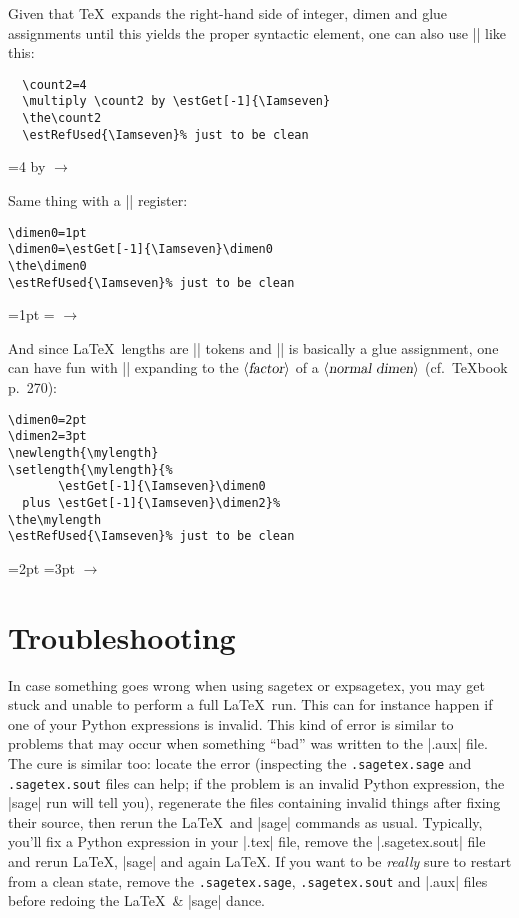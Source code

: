 \documentclass{article}
\newcommand*{\pkg}{\textsf}
\newcommand*{\meta}[1]{$\langle \textsl{#1} \rangle$}
\begin{document}
{%
  Given that \TeX\ expands the right-hand side of integer, dimen and glue
  assignments until this yields the proper syntactic element, one can also use
  |\estGet| like this:
  \begin{verbatim}
  \count2=4
  \multiply \count2 by \estGet[-1]{\Iamseven}
  \the\count2
  \estRefUsed{\Iamseven}% just to be clean
  \end{verbatim}
  =4
  \multiply {} by \estGet[-1]{\Iamseven}
  $\rightarrow$ \the{} %
  \estRefUsed{\Iamseven}
}

\bigskip
Same thing with a |\dimen| register:
\begin{verbatim}
\dimen0=1pt
\dimen0=\estGet[-1]{\Iamseven}\dimen0
\the\dimen0
\estRefUsed{\Iamseven}% just to be clean
\end{verbatim}
=1pt
=\estGet[-1]{\Iamseven}
$\rightarrow$ \the{} %
\estRefUsed{\Iamseven}

\newcommand*{\grammarsymbol}[1]{\mbox{\meta{#1}}}%
And since \LaTeX\ lengths are |\skipdef| tokens and |\setlength| is
basically a glue assignment, one can have fun with
|\estGet[-1]{\Iamseven}| expanding to the \grammarsymbol{factor} of
a \grammarsymbol{normal dimen} (cf.~\TeX book p.~270):
\begin{verbatim}
\dimen0=2pt
\dimen2=3pt
\newlength{\mylength}
\setlength{\mylength}{%
       \estGet[-1]{\Iamseven}\dimen0
  plus \estGet[-1]{\Iamseven}\dimen2}%
\the\mylength
\estRefUsed{\Iamseven}% just to be clean
\end{verbatim}
=2pt
=3pt
\newlength{\mylength}
%
$\rightarrow$ \the\mylength %
\estRefUsed{\Iamseven}

\section{Troubleshooting}

In case something goes wrong when using \pkg{sagetex} or \pkg{expsagetex}, you
may get stuck and unable to perform a full \LaTeX\ run. This can for instance
happen if one of your Python expressions is invalid. This kind of error is
similar to problems that may occur when something ``bad'' was written to the
|.aux| file. The cure is similar too: locate the error (inspecting the
\texttt{.sagetex.sage} and \texttt{.sagetex.sout} files can help; if the
problem is an invalid Python expression, the |sage| run will tell you),
regenerate the files containing invalid things after fixing their source, then
rerun the \LaTeX\ and |sage| commands as usual. Typically, you'll fix a Python
expression in your |.tex| file, remove the |.sagetex.sout| file and rerun
\LaTeX, |sage| and again \LaTeX. If you want to be \emph{really} sure to
restart from a clean state, remove the \texttt{.sagetex.sage},
\texttt{.sagetex.sout} and |.aux| files before redoing the \LaTeX\ \& |sage|
dance.
\end{document}
